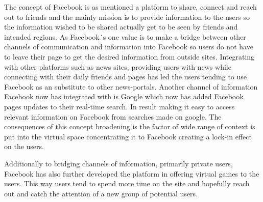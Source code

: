 \documentclass[conference]{IEEEtran}
\begin{document}
The concept of Facebook is as mentioned a platform to share, connect and reach
out to friends and the mainly mission is to provide information to the users so
the information wished to be shared actually get to be seen by friends and
intended regions. As Facebook´s one value is to make a bridge between other
channels of communication and information into Facebook so users do not have to
leave their page to get the desired information from outside sites. Integrating
with other platforms such as news sites, providing users with news while
connecting with their daily friends and pages has led the users tending to use
Facebook as an substitute to other news-portals. Another channel of information
Facebook now has integrated with is Google which now has added Facebook pages
updates to their real-time search. In result making it easy to access relevant
information on Facebook from searches made on google. The consequences of this
concept broadening is the factor of wide range of context is put into the
virtual space concentrating it to Facebook creating a lock-in effect on the
users. 

    
Additionally to bridging channels of information, primarily private users,
Facebook has also further developed the platform in offering virtual games to
the users. This way users tend to spend more time on the site and hopefully
reach out and catch the attention of a new group of potential users.
\end{document}
